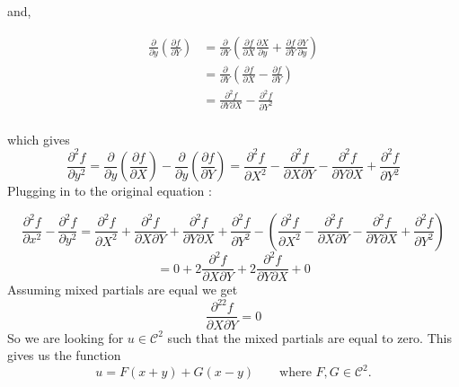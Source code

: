 and, 

\begin{align*}
    \frac{ \partial  }{ \partial y } \left( \frac{ \partial f }{ \partial Y } \right)  &=
    \frac{ \partial  }{ \partial Y } \left( \frac{ \partial f }{ \partial X } \frac{
    \partial X }{ \partial y } + \frac{ \partial f }{ \partial Y } \frac{ \partial Y }{
    \partial y } \right) \\ 
     &= \frac{ \partial  }{ \partial Y } \left( \frac{ \partial f }{ \partial X } - \frac{
     \partial f }{ \partial Y } \right)  \\
      &= \frac{ \partial ^2f }{ \partial Y \partial X } - \frac{ \partial ^2f }{ \partial
      Y^2}  \\ 
\end{align*}

which gives 
\[
\frac{ \partial ^2 f }{ \partial y^2 } =  \frac{ \partial  }{ \partial y } \left( \frac{ \partial f }{ \partial X } \right) - \frac{
\partial  }{ \partial y }\left( \frac{ \partial f }{ \partial Y } \right) = \frac{
\partial ^2f }{ \partial X^2 } - \frac{ \partial ^2 f }{ \partial X \partial Y } - \frac{
\partial ^2 f}{ \partial Y \partial X  } + \frac{ \partial ^2f }{ \partial Y^2 }  
\]
Plugging in to the original equation : 

\[
\frac{ \partial ^2 f }{ \partial x^2  } - \frac{ \partial ^2f }{ \partial y^2 } = 
\frac{ \partial ^2f }{ \partial X^2 } +
\frac{ \partial ^2f }{ \partial X \partial Y } + \frac{ \partial ^2f }{ \partial Y
\partial X } + \frac{ \partial ^2f }{ \partial Y^2 }     
- \left(  \frac{
\partial ^2f }{ \partial X^2 } - \frac{ \partial ^2 f }{ \partial X \partial Y } - \frac{
\partial ^2 f}{ \partial Y \partial X  } + \frac{ \partial ^2f }{ \partial Y^2 }   \right) 
\]
\[
= 0 + 2 \frac{ \partial ^2f }{ \partial X \partial Y } + 2 \frac{ \partial ^2f }{ \partial
Y \partial X} + 0
\]
Assuming mixed partials are equal we get 
\[
\frac{ \partial ^22f }{ \partial X \partial Y } = 0
\]
So we are looking for $ u \in \mathscr{ C } ^2 $ such that the mixed partials are equal to
zero. This gives us the function 
\[ u = F\left( x+y\right) + G\left( x-y\right)  
    \qquad \text{where } F,G \in \mathscr{ C } ^2. 
\]


